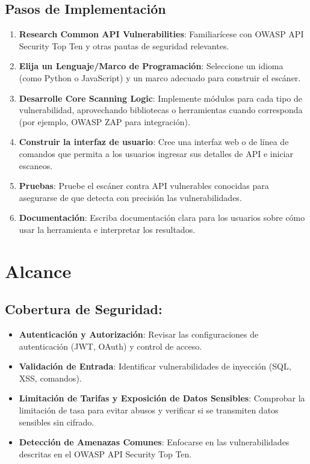\documentclass{article}
\begin{document}
    \subsection{Pasos de Implementación}

    \begin{enumerate}
        \item \textbf{Research Common API Vulnerabilities}: Familiarícese con OWASP API Security Top Ten y otras pautas de seguridad relevantes.
        \item \textbf{Elija un Lenguaje/Marco de Programación}: Seleccione un idioma (como Python o JavaScript) y un marco adecuado para construir el escáner.
        \item \textbf{Desarrolle Core Scanning Logic}: Implemente módulos para cada tipo de vulnerabilidad, aprovechando bibliotecas o herramientas cuando corresponda (por ejemplo, OWASP ZAP para integración).
        \item \textbf{Construir la interfaz de usuario}: Cree una interfaz web o de línea de comandos que permita a los usuarios ingresar sus detalles de API e iniciar escaneos.
        \item \textbf{Pruebas}: Pruebe el escáner contra API vulnerables conocidas para asegurarse de que detecta con precisión las vulnerabilidades.
        \item \textbf{Documentación}: Escriba documentación clara para los usuarios sobre cómo usar la herramienta e interpretar los resultados.
    \end{enumerate}
    
    \section{Alcance}

    \subsection{Cobertura de Seguridad:}
    \begin{itemize}
        \item \textbf{Autenticación y Autorización}: Revisar las configuraciones de autenticación (JWT, OAuth) y control de acceso.
        \item \textbf{Validación de Entrada}: Identificar vulnerabilidades de inyección (SQL, XSS, comandos).
        \item \textbf{Limitación de Tarifas y Exposición de Datos Sensibles}: Comprobar la limitación de tasa para evitar abusos y verificar si se transmiten datos sensibles sin cifrado.
        \item \textbf{Detección de Amenazas Comunes}: Enfocarse en las vulnerabilidades descritas en el OWASP API Security Top Ten.
    \end{itemize}
\end{document}
